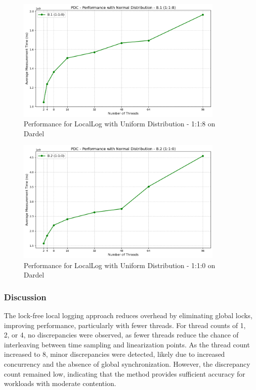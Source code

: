 \documentclass{article}
\begin{document}
\begin{figure}[H]
    \centering
    \includegraphics[width=0.9\textwidth]{LaTex/images/Lab 3 2.4.2.3.png}
    \caption{Performance for LocalLog with Uniform Distribution - 1:1:8 on Dardel}
    \label{fig:performance_dardel_1}
\end{figure}

\begin{figure}[H]
    \centering
    \includegraphics[width=0.9\textwidth]{LaTex/images/Lab 3 2.4.2.4.png}
    \caption{Performance for LocalLog with Uniform Distribution - 1:1:0 on Dardel}
    \label{fig:performance_dardel_2}
\end{figure}


\subsubsection{Discussion}
The lock-free local logging approach reduces overhead by eliminating global locks, improving performance, particularly with fewer threads. For thread counts of 1, 2, or 4, no discrepancies were observed, as fewer threads reduce the chance of interleaving between time sampling and linearization points. As the thread count increased to 8, minor discrepancies were detected, likely due to increased concurrency and the absence of global synchronization. However, the discrepancy count remained low, indicating that the method provides sufficient accuracy for workloads with moderate contention.
\end{document}
